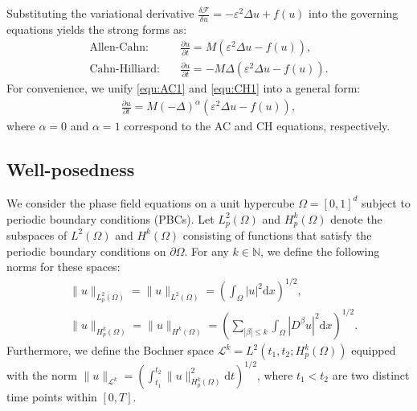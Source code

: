 \documentclass[11pt,reqno]{amsart}
\begin{document}
Substituting the variational derivative $\frac{\delta \mathcal{F}}{\delta u} = -\varepsilon^2 \Delta u + f(u)$ into the governing equations yields the strong forms as:
\begin{align}
	\label{equ:AC1}
	\text{Allen-Cahn:} & \quad \frac{\partial u}{\partial t} = M(\varepsilon^2\Delta u - f(u)), \\
	\label{equ:CH1}
	\text{Cahn-Hilliard:} & \quad \frac{\partial u}{\partial t} = -M\Delta(\varepsilon^2\Delta u - f(u)).
\end{align}
For convenience, we unify \eqref{equ:AC1} and \eqref{equ:CH1} into a general form:
\begin{align}
	\label{equ:general_form}
	\frac{\partial u}{\partial t} = M(-\Delta)^{\alpha}(\varepsilon^2\Delta u - f(u)),
\end{align}
where $\alpha=0$ and $\alpha=1$ correspond to the AC and CH equations, respectively.

\subsection{Well-posedness}
We consider the phase field equations on a unit hypercube $\Omega = [0,1]^d$ subject to periodic boundary conditions (PBCs). Let $L^2_p(\Omega)$ and $H^k_p(\Omega)$ denote the subspaces of $L^2(\Omega)$ and $H^k(\Omega)$ consisting of functions that satisfy the periodic boundary conditions on $\partial\Omega$. For any $k \in \mathbb{N}$, we define the following norms for these spaces:
\begin{align*}
	&\|u\|_{L^2_p(\Omega)} =\|u\|_{L^2(\Omega)} =  \left( \int_{\Omega} |u|^2 \mathrm{d}x \right)^{1/2},\\
	&\|u\|_{H^k_p(\Omega)} =\|u\|_{H^k(\Omega)} =\left( \sum_{|\beta| \leq k} \int_{\Omega} |D^{\beta} u|^2 \mathrm{d}x \right)^{1/2}.
\end{align*}
Furthermore, we define the Bochner space $\mathcal{L}^k = L^2(t_1,t_2; H^k_p(\Omega))$ equipped with the norm $\|u\|_{\mathcal{L}^k} = \left( \int_{t_1}^{t_2} \|u\|_{H^k_p(\Omega)}^2 \mathrm{d}t \right)^{1/2}$, where $t_1 < t_2$ are two distinct time points within $[0,T]$.
\end{document}
